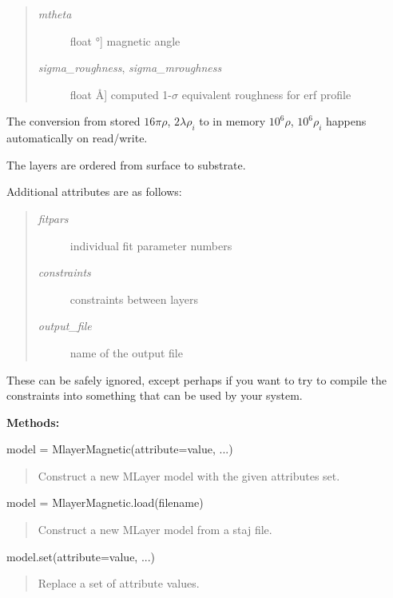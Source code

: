 \documentclass[letterpaper,10pt,english]{sphinxmanual}
\begin{document}
\begin{fulllineitems}
\begin{quote}
\begin{description}
\item[{\emph{mtheta}}] \leavevmode{[}float \textbar{} °{]}
magnetic angle

\item[{\emph{sigma\_roughness}, \emph{sigma\_mroughness}}] \leavevmode{[}float \textbar{} Å{]}
computed 1-$\sigma$ equivalent roughness for erf profile

\end{description}
\end{quote}

The conversion from stored $16 \pi \rho$, $2\lambda\rho_i$ to
in memory $10^6 \rho$, $10^6 \rho_i$  happens automatically on
read/write.

The layers are ordered from surface to substrate.

Additional attributes are as follows:
\begin{quote}
\begin{description}
\item[{\emph{fitpars}}] \leavevmode
individual fit parameter numbers

\item[{\emph{constraints}}] \leavevmode
constraints between layers

\item[{\emph{output\_file}}] \leavevmode
name of the output file

\end{description}
\end{quote}

These can be safely ignored, except perhaps if you want to try to
compile the constraints into something that can be used by your system.

\textbf{Methods:}

model = MlayerMagnetic(attribute=value, ...)
\begin{quote}

Construct a new MLayer model with the given attributes set.
\end{quote}

model = MlayerMagnetic.load(filename)
\begin{quote}

Construct a new MLayer model from a staj file.
\end{quote}

model.set(attribute=value, ...)
\begin{quote}

Replace a set of attribute values.
\end{quote}


\end{fulllineitems}
\end{document}
